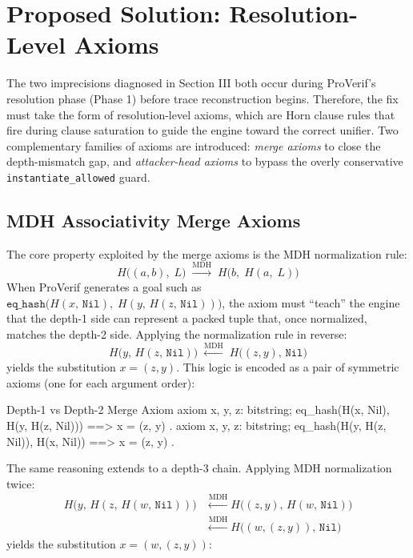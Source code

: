 \documentclass[journal]{IEEEtran}
\begin{document}
\section{Proposed Solution: Resolution-Level Axioms}

The two imprecisions diagnosed in Section III both occur during ProVerif's resolution phase (Phase 1) before trace reconstruction begins. Therefore, the fix must take the form of resolution-level axioms, which are Horn clause rules that fire during clause saturation to guide the engine toward the correct unifier. Two complementary families of axioms are introduced: \emph{merge axioms} to close the depth-mismatch gap, and \emph{attacker-head axioms} to bypass the overly conservative \texttt{instantiate\_allowed} guard.

\subsection{MDH Associativity Merge Axioms}

The core property exploited by the merge axioms is the MDH normalization rule:
\[
  H\bigl((a, b),\; L\bigr) \;\xrightarrow{\text{MDH}}\; H\bigl(b,\; H(a,\; L)\bigr)
\]
When ProVerif generates a goal such as $\texttt{eq\_hash}\bigl(H(x,\, \texttt{Nil}),\; H(y,\, H(z,\, \texttt{Nil}))\bigr)$, the axiom must ``teach'' the engine that the depth-1 side can represent a packed tuple that, once normalized, matches the depth-2 side. Applying the normalization rule in reverse:
\[
  H\bigl(y,\, H(z,\, \texttt{Nil})\bigr) \;\xleftarrow{\text{MDH}}\; H\bigl((z, y),\, \texttt{Nil}\bigr)
\]
yields the substitution $x = (z, y)$.  This logic is encoded as a pair of symmetric axioms (one for each argument order):

\begin{proverifcode}{Depth-1 vs Depth-2 Merge Axiom}
axiom x, y, z: bitstring;
  eq_hash(H(x, Nil), H(y, H(z, Nil))) ==>
    x = (z, y)
.
axiom x, y, z: bitstring;
  eq_hash(H(y, H(z, Nil)), H(x, Nil)) ==>
    x = (z, y)
.
\end{proverifcode}

The same reasoning extends to a depth-3 chain. Applying MDH normalization twice:
\begin{align*}
  H\bigl(y,\, H(z,\, H(w,\, \texttt{Nil}))\bigr) 
  &\xleftarrow{\text{MDH}} H\bigl((z,y),\, H(w,\, \texttt{Nil})\bigr) \\
  &\xleftarrow{\text{MDH}} H\bigl((w,(z,y)),\, \texttt{Nil}\bigr)
\end{align*}
yields the substitution $x = (w, (z, y))$:
\end{document}
